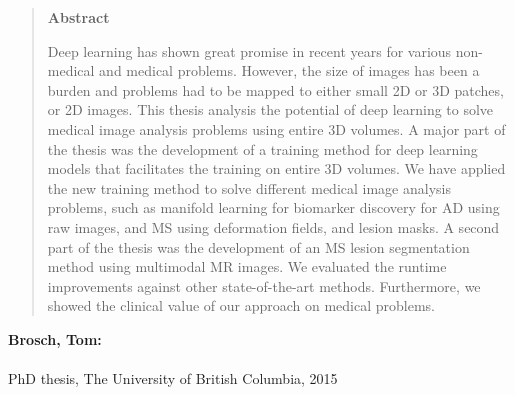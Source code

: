 \mbox{}\vspace{2em}
\begin{quotation}
\begin{center}
\textbf{Abstract}
\end{center}
\noindent

Deep learning has shown great promise in recent years for various non-medical
and medical problems. However, the size of images has been a burden and problems
had to be mapped to either small 2D or 3D patches, or 2D images. This thesis
analysis the potential of deep learning to solve medical image analysis problems
using entire 3D volumes. A major part of the thesis was the development of a
training method for deep learning models that facilitates the training on entire
3D volumes. We have applied the new training method to solve different medical
image analysis problems, such as manifold learning for biomarker discovery for
AD using raw images, and MS using deformation fields, and lesion masks. A second
part of the thesis was the development of an MS lesion segmentation method using
multimodal MR images. We evaluated the runtime improvements against other
state-of-the-art methods. Furthermore, we showed the clinical value of our
approach on medical problems.

\end{quotation}
\vfill
\noindent
\textbf{Brosch, Tom:}\\
\emph{\longtitle}\\
PhD thesis, The University of British Columbia, 2015